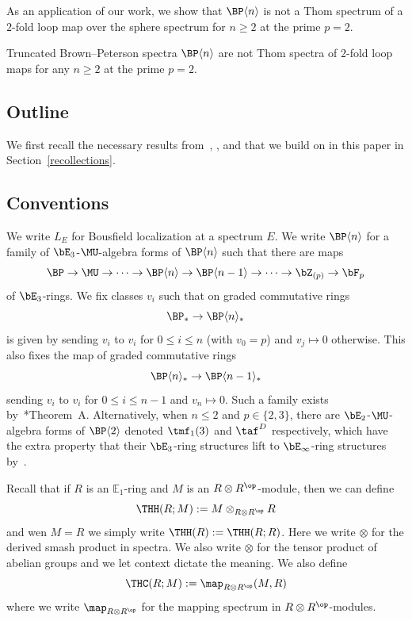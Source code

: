 As an application of our work, we show that $\BP\langle n\rangle$ is not a Thom spectrum of a $2$-fold loop map over the sphere spectrum for $n\ge 2$ at the prime $p=2$. 

\begin{thmx}\label{thm:main-thom}
Truncated Brown--Peterson spectra $\BP\langle n\rangle$ are not Thom spectra of $2$-fold loop maps for any $n\ge 2$ at the prime $p=2$. 
\end{thmx}

\subsection{Outline}
We first recall the necessary results from~\cite{AHL10}, \cite{AR05}, and \cite{ACH24} that we build on in this paper in Section~\ref{recollections}. 


\subsection{Conventions}
We write $L_{E}$ for Bousfield localization at a spectrum $E$. We write $\BP\langle n\rangle$ for a family of $\bE_3$-$\MU$-algebra forms of $\BP\langle n\rangle$ such that there are maps
\[
\BP\to \MU \to  \dots \to \BP\langle n\rangle\to  \BP\langle n-1\rangle\to  \dots  \to \bZ_{(p)}\to \bF_{p}
\]
of $\bE_3$-rings. 
We fix classes $v_i$ such that on graded commutative rings
\[
\BP_*\to  \BP\langle n\rangle_*
\]
is given by sending $v_i$ to $v_i$ for $0\le i\le n$ (with $v_0=p$) and $v_j\mapsto 0$ otherwise. 
This also fixes the map of graded commutative rings 
\[  
    \BP\langle n\rangle_*\to  \BP\langle n-1\rangle_*
\]
sending $v_i$ to $v_i$ for $0\le i\le n-1$ and $v_n\mapsto 0$. Such a family exists by~\cite{HW22}*{Theorem~A}. 
Alternatively, when $n\le 2$ and $p\in \{2,3\}$, there are $\bE_2$-$\MU$-algebra forms of $\BP\langle 2\rangle$ denoted $\tmf_1(3)$ and $\taf^{D}$ respectively, which have the extra property that their $\bE_3$-ring structures lift to $\bE_\infty$-ring structures by~\cites{HL10,LN12,LN14,CM15}. 

Recall that if $R$ is an $\mathbb{E}_1$-ring and $M$ is an $R\otimes R^{\op}$-module, then we can define 
\[ 
\THH(R;M):=M\otimes_{R\otimes R^{\op}}R
\]
and wen $M=R$ we simply write $\THH(R):=\THH(R;R)$. Here we write $\otimes$ for the derived smash product in spectra. We also write $\otimes$ for the tensor product of abelian groups and we let context dictate the meaning. We also define 
\[ 
\THC(R;M):=\map_{R\otimes R^{\op}}(M,R)
\]
where we write $\map_{R\otimes R^{\op}}$ for the mapping spectrum in $R\otimes R^{\op}$-modules. 


